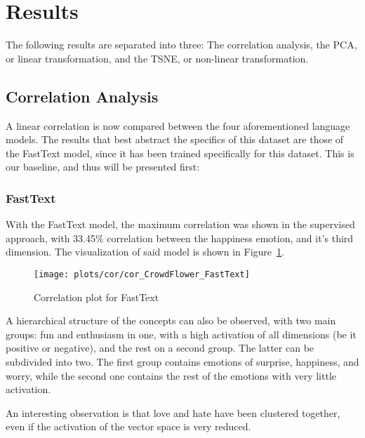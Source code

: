 \section{Results}\label{sec:Results}

The following results are separated into three: The correlation analysis, the PCA, or linear transformation, and the TSNE, or non-linear transformation.

\subsection{Correlation Analysis}\label{sub:Correlation Analysis}
A linear correlation is now compared between the four aforementioned language models. The results that best abstract the specifics of this dataset are those of the FastText model, since it has been trained specifically for this dataset. This is our baseline, and thus will be presented first:


\subsubsection{FastText}
With the FastText model, the maximum correlation was shown in the supervised approach, with 33.45\% correlation between the happiness emotion, and it's third dimension. The visualization of said model is shown in Figure~\ref{fig:cor_CrowdFlower_FastText}.

\begin{figure}[H]
  \texttt{[image: plots/cor/cor\_CrowdFlower\_FastText]}
  \centering
  \caption{Correlation plot for FastText}\label{fig:cor_CrowdFlower_FastText}
\end{figure}

A hierarchical structure of the concepts can also be observed, with two main groups: fun and enthusiasm in one, with a high activation of all dimensions (be it positive or negative), and the rest on a second group. The latter can be subdivided into two. The first group contains emotions of surprise, happiness, and worry, while the second one contains the rest of the emotions with very little activation.

An interesting observation is that love and hate have been clustered together, even if the activation of the vector space is very reduced.

